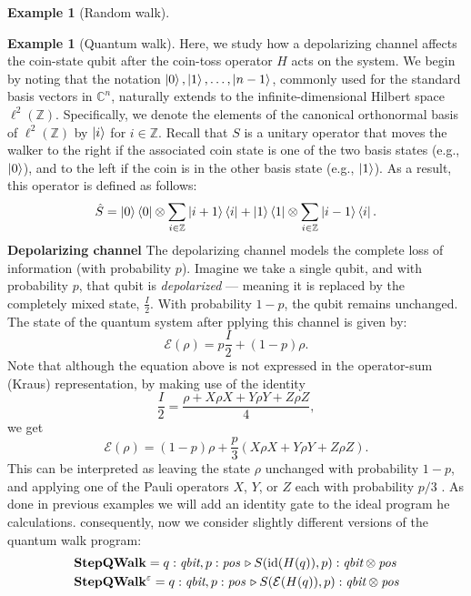 \documentclass[10pt,a4paper]{amsart}
\theoremstyle{definition}
\theoremstyle{definition}
\newtheorem{example}[definition]{Example}
\theoremstyle{definition}
\theoremstyle{definition}
\theoremstyle{definition}
\theoremstyle{definition}
\begin{document}
\begin{example}[Random walk]
\begin{example} [Quantum walk]
  Here, we study how a depolarizing channel affects the coin-state qubit after the coin-toss operator $ H $ acts on the system. 
We begin by noting that the notation $\ket{0}, \ket{1}, \ldots, \ket{n-1}$, commonly used for the standard basis vectors in $\mathbb{C}^{n}$, naturally extends to the infinite-dimensional Hilbert space $\ell^2(\mathbb{Z})$. Specifically, we denote the elements of the canonical orthonormal basis of $\ell^2(\mathbb{Z})$ by $\ket{i}$ for $i \in \mathbb{Z}$. Recall that $S$ is a unitary operator that moves the walker to the right if the associated coin state is one of the two basis states (e.g., $\ket{0}$), and to the left if the coin is in the other basis state (e.g., $\ket{1}$). As a result, this operator is defined as follows:
\begin{equation*}
\hat{S} = \ket{0}\bra{0} \otimes \sum_{i \in \mathbb{Z}} \ket{i+1}\bra{i} + \ket{1}\bra{1} \otimes \sum_{i \in \mathbb{Z}} \ket{i-1}\bra{i}.
\end{equation*}
 \textbf{Depolarizing channel}
The depolarizing channel models the complete loss of information (with probability $p$). Imagine we take a single qubit, and with probability $p$, that qubit is \emph{depolarized} — meaning it is replaced by the completely mixed state, $\frac{I}{2}$. With probability $1 - p$, the qubit remains unchanged. The state of the quantum system after pplying this channel is given by:
\begin{equation*}
\mathcal{E}(\rho) = p \frac{I}{2} + (1 - p)\rho.
\end{equation*}
Note that although the equation above is not expressed in the operator-sum (Kraus) representation, by making use of the identity
\begin{equation*}
  \frac{I}{2} = \frac{\rho + X\rho X + Y\rho Y + Z\rho Z}{4},
\end{equation*}
we get
\begin{equation*}
\mathcal{E}(\rho) = (1 - p)\rho + \frac{p}{3} \left(X\rho X + Y\rho Y + Z\rho Z\right).
\end{equation*}
This can be interpreted as leaving the state $\rho$ unchanged with probability $1 - p$, and applying one of the Pauli operators $X$, $Y$, or $Z$ each with probability $p/3$ \cite[Section 8.3.3]{nielsen2010quantum}. 
As done in previous examples we will add an identity gate to the ideal program he calculations. consequently, now we consider slightly different versions of the quantum walk program:
\begin{align*}\label{eq:id_error_qw}
  &\textbf{StepQWalk} = q: \emph{qbit}, p: \emph{pos} \, \triangleright  S( \mathrm{id}(H(q)), p) : \emph{qbit} \otimes \emph{pos} \\
  & \textbf{StepQWalk}^{\varepsilon} = q: \emph{qbit}, p: \emph{pos} \, \triangleright  S( \mathcal{E}(H(q)), p) : \emph{qbit} \otimes \emph{pos}
\end{align*}


\end{example}
\end{example}
\end{document}
